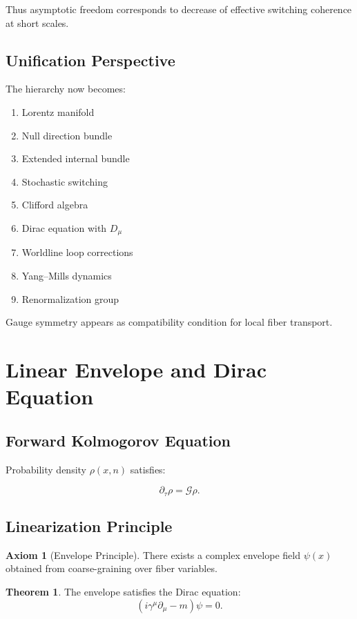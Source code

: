 \documentclass[11pt]{article}
\theoremstyle{definition}
\newtheorem{axiom}[definition]{Axiom}
\newtheorem{theorem}[definition]{Theorem}
\begin{document}
Thus asymptotic freedom corresponds to
decrease of effective switching coherence at short scales.

\subsection{Unification Perspective}

The hierarchy now becomes:

\begin{enumerate}
\item Lorentz manifold
\item Null direction bundle
\item Extended internal bundle
\item Stochastic switching
\item Clifford algebra
\item Dirac equation with $D_\mu$
\item Worldline loop corrections
\item Yang–Mills dynamics
\item Renormalization group
\end{enumerate}

Gauge symmetry appears as
compatibility condition for local fiber transport.
\section{Linear Envelope and Dirac Equation}

\subsection{Forward Kolmogorov Equation}

Probability density $\rho(x,n)$ satisfies:

\[
\partial_\tau \rho = \mathcal{G}\rho.
\]

\subsection{Linearization Principle}

\begin{axiom}[Envelope Principle]
There exists a complex envelope field $\psi(x)$
obtained from coarse-graining over fiber variables.
\end{axiom}

\begin{theorem}
The envelope satisfies the Dirac equation:
\[
(i\gamma^\mu \partial_\mu - m)\psi=0.
\]
\end{theorem}
\end{document}
